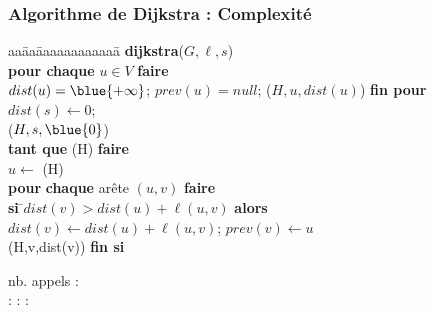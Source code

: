 
   \begin{frame}
     \frametitle{Algorithme de Dijkstra : Complexité}
          \begin{tabbing}
       aa\=aa\=aaaaaaaaaaaa\=\kill
       \textbf{dijkstra}($G,\ell,s$) \\
       \> \textbf{pour chaque} $u \in V$ \textbf{faire} \\
       \> \> $dist(u) = \blue{\mathbf{+\infty}}$; $prev(u) = null$; ($H,u,dist(u)$)         \textbf{fin pour} \\
       \>  $dist(s) \leftarrow 0$;\\
       \>  ($H,s,\blue{0}$) \\
       \> \textbf{tant que} (H) \textbf{faire} \\
       \> \> $u \leftarrow$ (H) \\
       \> \> \textbf{pour}\= \textbf{ chaque} arête $(u,v)$ \textbf{faire} \\
       \> \> \> \textbf{si} \=$dist(v) > dist(u) + \ell(u, v)$ \textbf{alors} \\
       \> \> \> \> $dist(v) \leftarrow dist(u) + \ell(u, v)$; $ prev(v) \leftarrow u$ \\
       \> \> \> \> (H,v,dist(v)) \textbf{fin si}
     \end{tabbing}
     nb. appels : \\ 
      : \uncover<2->{$\mathbf{|V|}$}
       : 
       : 
     
   \end{frame}
   

